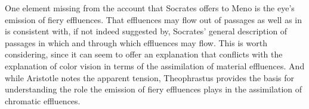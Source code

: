 One element missing from the account that Socrates offers to Meno is the eye's emission of fiery effluences. That effluences may flow out of passages as well as in is consistent with, if not indeed suggested by, Socrates' general description of passages in which and through which effluences may flow. This is worth considering, since it can seem to offer an explanation that conflicts with the explanation of color vision in terms of the assimilation of material effluences. And while Aristotle notes the apparent tension, Theophrastus provides the basis for understanding the role the emission of fiery effluences plays in the assimilation of chromatic effluences.

